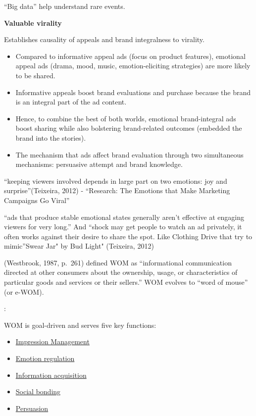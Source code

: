 \documentclass[
]{book}
\providecommand{\tightlist}{%
  \setlength{\itemsep}{0pt}\setlength{\parskip}{0pt}}
\begin{document}
``Big data'' help understand rare events.

\textbf{Valuable virality} \citep{Akpinar_2017}

Establishes causality of appeals and brand integralness to virality.

\begin{itemize}
\tightlist
\item
  Compared to informative appeal ads (focus on product features), emotional appeal ads (drama, mood, music, emotion-eliciting strategies) are more likely to be shared.\\
\item
  Informative appeals boost brand evaluations and purchase because the brand is an integral part of the ad content.\\
\item
  Hence, to combine the best of both worlds, emotional brand-integral ads boost sharing while also bolstering brand-related outcomes (embedded the brand into the stories).\\
\item
  The mechanism that ads affect brand evaluation through two simultaneous mechanisms: persuasive attempt and brand knowledge.
\end{itemize}

``keeping viewers involved depends in large part on two emotions: joy and surprise''(Teixeira, 2012) - ``Research: The Emotions that Make Marketing Campaigns Go Viral''

``ads that produce stable emotional states generally aren't effective at engaging viewers for very long.'' And ``shock may get people to watch an ad privately, it often works against their desire to share the spot. Like Clothing Drive that try to mimic''Swear Jar" by Bud Light" (Teixeira, 2012)

(Westbrook, 1987, p.~261) defined WOM as ``informational communication directed at other consumers about the ownership, usage, or characteristics of particular goods and services or their sellers.'' WOM evolves to ``word of mouse'' (or e-WOM).

\citep{Berger_2014}:

WOM is goal-driven and serves five key functions:

\begin{itemize}
\tightlist
\item
  \protect\hyperlink{impression-management}{Impression Management}
\item
  \protect\hyperlink{emotion-regulation}{Emotion regulation}
\item
  \protect\hyperlink{information-acquisition}{Information acquisition}
\item
  \protect\hyperlink{social-bonding}{Social bonding}
\item
  \protect\hyperlink{persuading-others}{Persuasion}
\end{itemize}
\end{document}
